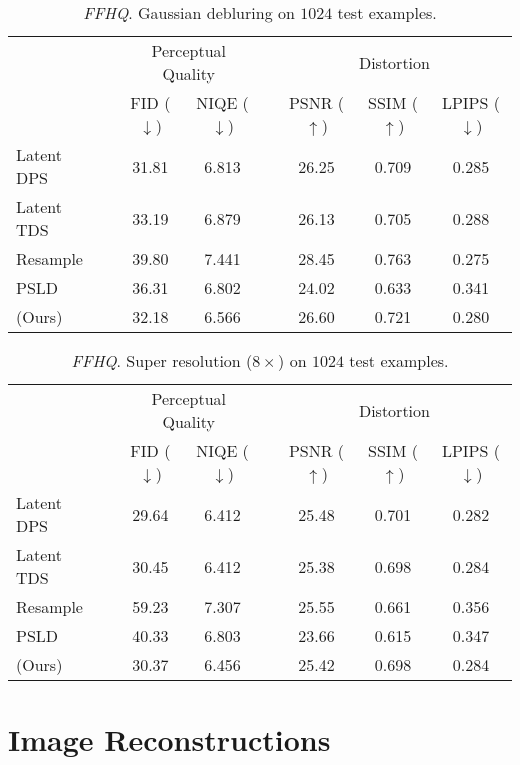 \begin{table*}[!h]
\centering
\caption{\textit{FFHQ}. Gaussian debluring on $1024$ test examples.}
\begin{tabular}{l c cc c ccc}
    \toprule
    && \multicolumn{2}{c}{Perceptual Quality} && \multicolumn{3}{c}{Distortion}\\
    \cmidrule(l){3-4}  \cmidrule(l){6-8}
    && FID ($\downarrow$) & NIQE ($\downarrow$) && PSNR ($\uparrow$) & SSIM ($\uparrow$) & LPIPS ($\downarrow$) \\
    \midrule
    Latent DPS && 31.81 & 6.813 && 26.25 & 0.709 & 0.285\\
    Latent TDS && 33.19 & 6.879 && 26.13 & 0.705 & 0.288\\
    Resample && 39.80 & 7.441 && 28.45 & 0.763 & 0.275\\
    PSLD && 36.31 & 6.802 && 24.02 & 0.633 & 0.341\\ 
    \midrule
    \MN{} (Ours) && 32.18 & 6.566 && 26.60 & 0.721 & 0.280\\ 
    \bottomrule
    \end{tabular}
\label{tab:gd_ffhq}
\end{table*}


\begin{table*}[!h]
\centering
\caption{\textit{FFHQ}. Super resolution ($8 \times$) on $1024$ test examples.}
\begin{tabular}{l c cc c ccc}
    \toprule
    && \multicolumn{2}{c}{Perceptual Quality} && \multicolumn{3}{c}{Distortion}\\
    \cmidrule(l){3-4}  \cmidrule(l){6-8}
    && FID ($\downarrow$) & NIQE ($\downarrow$) && PSNR ($\uparrow$) & SSIM ($\uparrow$) & LPIPS ($\downarrow$) \\
    \midrule
    Latent DPS && 29.64 & 6.412 && 25.48 & 0.701 & 0.282\\
    Latent TDS && 30.45 & 6.412 && 25.38 & 0.698 & 0.284\\
    Resample && 59.23 & 7.307 && 25.55 & 0.661 & 0.356\\
    PSLD && 40.33 & 6.803 && 23.66 & 0.615 & 0.347\\ 
    \midrule
    \MN{} (Ours) && 30.37 & 6.456 && 25.42 & 0.698 & 0.284\\ 
    \bottomrule
    \end{tabular}
\label{tab:sr_ffhq}
\end{table*}

\newpage
\section{Image Reconstructions}
\label{sec:img_rec}

